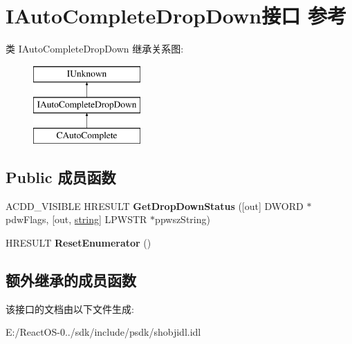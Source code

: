 \hypertarget{interface_i_auto_complete_drop_down}{}\section{I\+Auto\+Complete\+Drop\+Down接口 参考}
\label{interface_i_auto_complete_drop_down}
类 I\+Auto\+Complete\+Drop\+Down 继承关系图\+:\begin{figure}[H]
\begin{center}
\leavevmode
\includegraphics[height=3.000000cm]{interface_i_auto_complete_drop_down}
\end{center}
\end{figure}
\subsection*{Public 成员函数}
\begin{DoxyCompactItemize}
\item 
\mbox{\label{interface_i_auto_complete_drop_down_a26095e7d9dbd76f9a7df771e08a01847}} 
A\+C\+D\+D\+\_\+\+V\+I\+S\+I\+B\+LE H\+R\+E\+S\+U\+LT {\bfseries Get\+Drop\+Down\+Status} (\mbox{[}out\mbox{]} D\+W\+O\+RD $\ast$pdw\+Flags, \mbox{[}out, \hyperlink{structstring}{string}\mbox{]} L\+P\+W\+S\+TR $\ast$ppwsz\+String)
\item 
\mbox{\label{interface_i_auto_complete_drop_down_aea0633dc33ea749f3c46ceec86eadada}} 
H\+R\+E\+S\+U\+LT {\bfseries Reset\+Enumerator} ()
\end{DoxyCompactItemize}
\subsection*{额外继承的成员函数}


该接口的文档由以下文件生成\+:\begin{DoxyCompactItemize}
\item 
E\+:/\+React\+O\+S-\/0../sdk/include/psdk/shobjidl.\+idl\end{DoxyCompactItemize}
